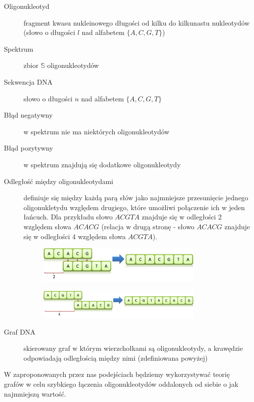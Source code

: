 \documentclass[a4paper,10pt]{article}
\begin{document}
\begin{description}
  \item[Oligonukleotyd] fragment kwasu nukleinowego długości od kilku do kilkunastu nukleotydów (słowo o długości $l$ nad alfabetem $\{A, C, G, T\}$)
  \item[Spektrum] zbior $\mathbb{S}$ oligonukleotydów
  \item[Sekwencja DNA] słowo o długości $n$ nad alfabetem $\{A, C, G, T\}$
  \item[Błąd negatywny] w spektrum nie ma niektórych oligonukleotydów
  \item[Błąd pozytywny] w spektrum znajdują się dodatkowe oligonukleotydy
  \item[Odległość między oligonukleotydami] definiuje się między każdą parą słów jako najmniejsze przesunięcie jednego oligonukletydu
                                            względem drugiego, które umożliwi połączenie ich w jeden łańcuch. Dla przykładu słowo $ACGTA$
                                            znajduje się w odległości 2 względem słowa $ACACG$ (relacja w drugą stronę - słowo $ACACG$ 
                                            znajduje się w odległości 4 względem słowa $ACGTA$).

  \begin{figure}[h]
    \footnotesize\centering
    \includegraphics[width=0.8\textwidth,keepaspectratio]{Distance1.png}
  \end{figure}

  \begin{figure}[h]
    \footnotesize\centering
    \includegraphics[width=0.8\textwidth,keepaspectratio]{Distance2.png}
  \end{figure}
  \item[Graf DNA] skierowany graf w którym wierzchołkami są oligonukleotydy, a krawędzie odpowiadają odległością między nimi (zdefiniowana powyżej)
\end{description}

W zaproponowanych przez nas podejściach będziemy wykorzystywać teorię grafów w celu szybkiego łączenia oligonukleotydów oddalonych od siebie o jak najmniejszą wartość.
\end{document}

